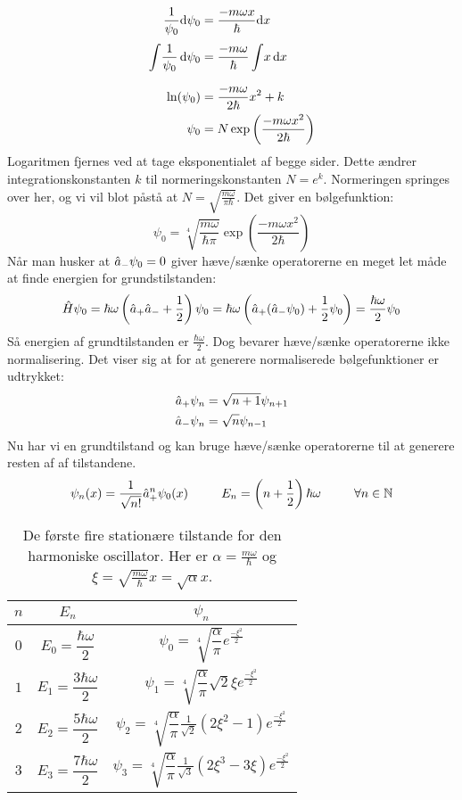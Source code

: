 \documentclass[../Kvantemekanik.tex]{subfiles}
\begin{document}
\begin{align*}
\frac{1}{\psi_0}\mathrm{d} \psi_0 &=\frac{-m\omega x}{\hbar}\mathrm{d} x\\
\int\limits_{}^{} \! \frac{1}{\psi_0} \, \textrm{d}\psi_0 &= \frac{-m\omega}{\hbar}\int\limits_{}^{} \! x \, \textrm{d}x\\
\ln(\psi_0) &= \frac{-m\omega}{2\hbar}x^2+k\\
\psi_0 &= N\exp\left({\frac{-m\omega x^2}{2\hbar}}\right)
\end{align*}
Logaritmen fjernes ved at tage eksponentialet af begge sider. Dette ændrer integrationskonstanten $k$ til normeringskonstanten $N=e^k$. Normeringen springes over her, og vi vil blot påstå at $N=\sqrt{\frac{m\omega}{\pi\hbar}}$. Det giver en bølgefunktion:
\begin{equation}
\psi_0 = \sqrt[4]{\frac{m\omega}{\hbar\pi}}\exp\left(\frac{-m\omega x^2}{2\hbar}\right)
\end{equation}
Når man husker at $\hat a_-\psi_0 =0$ giver hæve/sænke operatorerne en meget let måde at finde energien for grundstilstanden:
$$
\hat H \psi_0 = \hbar\omega\left(\hat a_+\hat a_- +\frac{1}{2}\right)\psi_0 = \hbar\omega\left(\hat a_+(\hat a_- \psi_0)+\frac{1}{2}\psi_0\right) = \frac{\hbar\omega}{2}\psi_0
$$
Så energien af grundtilstanden er $\frac{\hbar\omega}{2}$.
Dog bevarer hæve/sænke operatorerne ikke normalisering. Det viser sig at for at generere normaliserede bølgefunktioner er udtrykket:
\begin{align*}
\hat a_+\psi_n &= \sqrt{n+1}\psi_{n+1}\\
\hat a_- \psi_n &= \sqrt{n}\psi_{n-1}
\end{align*}
 Nu har vi en grundtilstand og kan bruge hæve/sænke operatorerne til at generere resten af af tilstandene.
\begin{equation}
\psi_n(x) = \frac{1}{\sqrt{n!}}\hat a_+^n\psi_0(x)~~~~~~~~E_n = \left(n+\frac{1}{2}\right)\hbar\omega~~~~~~~~\forall n\in\mathbb{N}
\end{equation}
\begin{table}
\center
\begin{tabular}{|c c c|}
$n$&$E_n$&$\psi_n$\\\hline
$0$ & $E_0 = \dfrac{\hbar\omega}{2}$ & $\psi_0 = \sqrt[4]{\dfrac{\alpha}{\pi}}e^{\frac{-\xi^2}{2}}$\\
$1$ & $E_1 = \dfrac{3\hbar\omega}{2}$ & $\psi_1 = \sqrt[4]{\dfrac{\alpha}{\pi}}\sqrt{2}\xi e^{\frac{-\xi^2}{2}}$\\
$2$ & $E_2 = \dfrac{5\hbar\omega}{2}$ & $\psi_2 = \sqrt[4]{\dfrac{\alpha}{\pi}}\frac{1}{\sqrt{2}} (2\xi^2-1) e^{\frac{-\xi^2}{2}}$\\
$3$ & $E_3 = \dfrac{7\hbar\omega}{2}$ & $\psi_3 = \sqrt[4]{\dfrac{\alpha}{\pi}}\frac{1}{\sqrt{3}} (2\xi^3-3\xi) e^{\frac{-\xi^2}{2}}$\\\hline
\end{tabular}
\caption{De første fire stationære tilstande for den harmoniske oscillator. Her er $\alpha = \frac{m\omega}{\hbar}$ og $\xi = \sqrt{\frac{m\omega}{\hbar}}x = \sqrt{\alpha}x$.}
\end{table}
\end{document}
